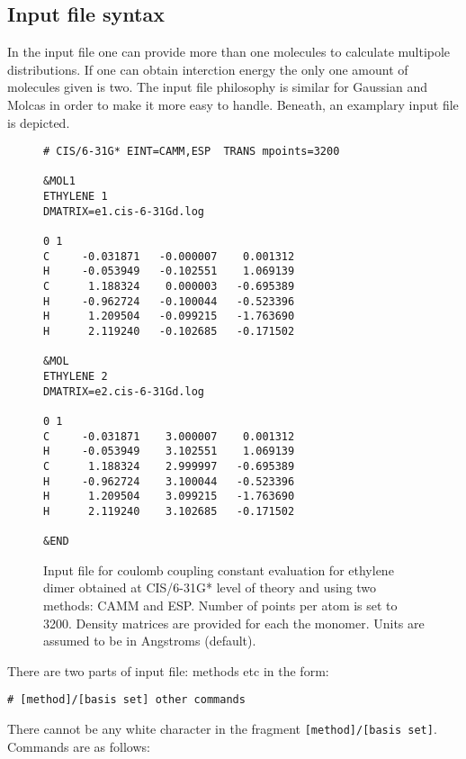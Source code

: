 \documentclass[a4paper,titlepage,twoside,fleqn]{article}
\begin{document}
\subsection{Input file syntax\label{sec:inp}}

In the input file one can provide more than one molecules to calculate
multipole distributions. If one can obtain interction energy the only
one amount of molecules given is two. The input file philosophy is similar
for Gaussian and Molcas in order to make it more easy to handle. Beneath,
an examplary input file is depicted. 
\begin{figure}
\begin{verbatim}
# CIS/6-31G* EINT=CAMM,ESP  TRANS mpoints=3200

&MOL1
ETHYLENE 1
DMATRIX=e1.cis-6-31Gd.log

0 1
C     -0.031871   -0.000007    0.001312
H     -0.053949   -0.102551    1.069139
C      1.188324    0.000003   -0.695389
H     -0.962724   -0.100044   -0.523396
H      1.209504   -0.099215   -1.763690
H      2.119240   -0.102685   -0.171502

&MOL
ETHYLENE 2 
DMATRIX=e2.cis-6-31Gd.log

0 1
C     -0.031871    3.000007    0.001312
H     -0.053949    3.102551    1.069139
C      1.188324    2.999997   -0.695389
H     -0.962724    3.100044   -0.523396
H      1.209504    3.099215   -1.763690
H      2.119240    3.102685   -0.171502

&END

\end{verbatim}
\caption{Input file for coulomb coupling constant evaluation
         for ethylene dimer obtained at CIS/6-31G* level of theory
         and using two methods: CAMM and ESP. Number of points
         per atom is set to 3200. Density matrices are provided
         for each the monomer. Units are assumed to be in Angstroms 
         (default).}
\end{figure}
There are two parts of input file: methods etc in the form:
\begin{verbatim}
# [method]/[basis set] other commands 
\end{verbatim}
There cannot be any white character in the fragment \verb+[method]/[basis set]+.
Commands are as follows:
\end{document}
